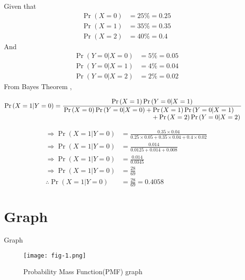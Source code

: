 \documentclass{beamer}
\providecommand{\pr}[1]{\ensuremath{\Pr\left(#1\right)}}
\begin{document}
\begin{frame}
Given that 
\begin{align}
\pr{X=0} &= 25\% = 0.25 \\
\pr{X=1} &= 35\% = 0.35 \\
\pr{X=2} &= 40\% = 0.4 
\end{align} 
And 
\begin{align}
\pr{Y=0|X=0} &= 5\% = 0.05 \\
\pr{Y=0|X=1} &= 4\% = 0.04 \\
\pr{Y=0|X=2} &= 2\% = 0.02
\end{align}
From Bayes Theorem , \\
\begin{footnotesize}
\begin{align}
\pr{X=1|Y=0} &= \frac{\pr{X=1}\pr{Y=0|X=1}}{\splitfrac{\pr{X=0}\pr{Y=0|X=0}+\pr{X=1}\pr{Y=0|X=1}}{+\pr{X=2}\pr{Y=0|X=2}}}
\end{align}
\end{footnotesize}

\end{frame}

\begin{frame}

\begin{align}
\Rightarrow \pr{X=1|Y=0} &= \frac{0.35 \times 0.04}{0.25 \times 0.05 + 0.35 \times 0.04 + 0.4 \times 0.02 } \\
\Rightarrow \pr{X=1|Y=0} &= \frac{0.014}{0.0125+0.014+0.008} \\
\Rightarrow \pr{X=1|Y=0} &= \frac{0.014}{0.0345} \\ 
\Rightarrow \pr{X=1|Y=0} &= \frac{28}{69} \\ 
\therefore  \pr{X=1|Y=0} &= \frac{28}{69} = 0.4058 
\end{align}

\end{frame}

\section{Graph}
\begin{frame}{Graph}
\begin{figure}[h]
\texttt{[image: fig-1.png]}
\caption{Probability Mass Function(PMF) graph}
\label{Fig-1}
\end{figure}
\end{frame}
\end{document}
